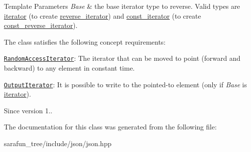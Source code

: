 \begin{DoxyTemplParams}{Template Parameters}
{\em Base} & the base iterator type to reverse. Valid types are \hyperlink{classnlohmann_1_1basic__json_1_1iterator}{iterator} (to create \hyperlink{classnlohmann_1_1basic__json_a2f1f83aa187a56dc5ec7a7027065ac8a_a2f1f83aa187a56dc5ec7a7027065ac8a}{reverse\-\_\-iterator}) and \hyperlink{classnlohmann_1_1basic__json_1_1const__iterator}{const\-\_\-iterator} (to create \hyperlink{classnlohmann_1_1basic__json_ae336fff01f4b78e3e16e5008dc8dbc00_ae336fff01f4b78e3e16e5008dc8dbc00}{const\-\_\-reverse\-\_\-iterator}).\\
\hline
\end{DoxyTemplParams}
The class satisfies the following concept requirements\-:
\begin{DoxyItemize}
\item \href{http://en.cppreference.com/w/cpp/concept/RandomAccessIterator}{\tt Random\-Access\-Iterator}\-: The iterator that can be moved to point (forward and backward) to any element in constant time.
\item \href{http://en.cppreference.com/w/cpp/concept/OutputIterator}{\tt Output\-Iterator}\-: It is possible to write to the pointed-\/to element (only if {\itshape Base} is \hyperlink{classnlohmann_1_1basic__json_1_1iterator}{iterator}).
\end{DoxyItemize}

\begin{DoxySince}{Since}
version 1.. 
\end{DoxySince}


The documentation for this class was generated from the following file\-:\begin{DoxyCompactItemize}
\item 
sarafun\-\_\-tree/include/json/json.\-hpp\end{DoxyCompactItemize}
